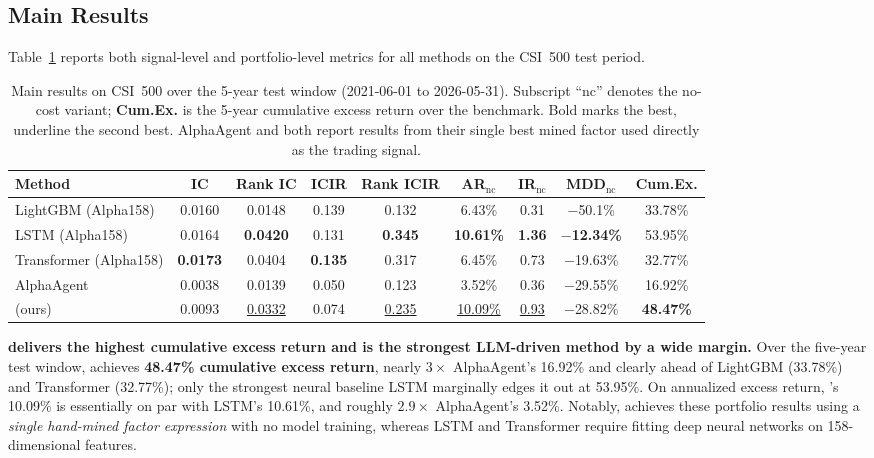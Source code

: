 \subsection{Main Results}
\label{sec:main-results}

Table~\ref{tab:main} reports both signal-level and portfolio-level metrics for all methods on the CSI~500 test period.

\begin{table}[t]
  \centering
  \small
  \setlength{\tabcolsep}{4pt}
  \begin{tabular}{lcccccccc}
    \toprule
    \textbf{Method} & \textbf{IC} & \textbf{Rank IC} & \textbf{ICIR} & \textbf{Rank ICIR}
    & \textbf{AR}$_{\text{nc}}$ & \textbf{IR}$_{\text{nc}}$ & \textbf{MDD}$_{\text{nc}}$
    & \textbf{Cum.Ex.} \\
    \midrule
    LightGBM (Alpha158)    & 0.0160 & 0.0148           & 0.139 & 0.132           & 6.43\% & 0.31 & $-$50.1\% & 33.78\% \\
    LSTM (Alpha158)        & 0.0164 & \textbf{0.0420}  & 0.131 & \textbf{0.345}  & \textbf{10.61\%} & \textbf{1.36} & \textbf{$-$12.34\%} & 53.95\% \\
    Transformer (Alpha158) & \textbf{0.0173} & 0.0404  & \textbf{0.135} & 0.317  & 6.45\%  & 0.73 & $-$19.63\% & 32.77\% \\
    AlphaAgent             & 0.0038 & 0.0139           & 0.050 & 0.123           & 3.52\%  & 0.36 & $-$29.55\% & 16.92\% \\
    \midrule
    \prjname{} (ours)      & 0.0093 & \underline{0.0332} & 0.074 & \underline{0.235}
                           & \underline{10.09\%} & \underline{0.93} & $-$28.82\% & \textbf{48.47\%} \\
    \bottomrule
  \end{tabular}
  \vspace{0.5em}
  \caption{Main results on CSI~500 over the 5-year test window (2021-06-01 to 2026-05-31).
  Subscript ``nc'' denotes the no-cost variant; \textbf{Cum.Ex.}{} is the 5-year
  cumulative excess return over the benchmark.
  Bold marks the best, underline the second best.
  AlphaAgent and \prjname{} both report results from their single best mined factor
  used directly as the trading signal.}
  \label{tab:main}
\end{table}

\textbf{\prjname{} delivers the highest cumulative excess return and is the strongest LLM-driven method by a wide margin.}
Over the five-year test window, \prjname{} achieves \textbf{48.47\% cumulative excess return}, nearly $3\times$ AlphaAgent's 16.92\% and clearly ahead of LightGBM (33.78\%) and Transformer (32.77\%); only the strongest neural baseline LSTM marginally edges it out at 53.95\%.
On annualized excess return, \prjname{}'s 10.09\% is essentially on par with LSTM's 10.61\%, and roughly $2.9\times$ AlphaAgent's 3.52\%.
Notably, \prjname{} achieves these portfolio results using a \emph{single hand-mined factor expression} with no model training, whereas LSTM and Transformer require fitting deep neural networks on 158-dimensional features.

